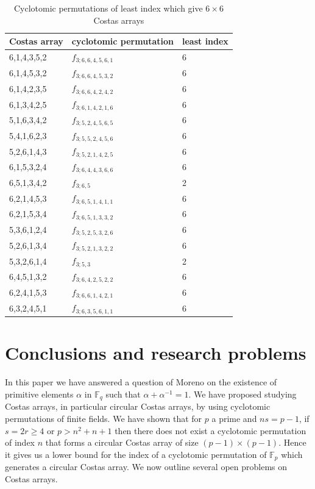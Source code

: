 \documentclass[10pt]{amsart}
\begin{document}
\begin{table}
\caption{Cyclotomic permutations of least index which give $6 \times 6$
Costas arrays}
\label{costas6}
\begin{tabular}{l|l|l}
Costas array&cyclotomic permutation&least index\\
\hline
6,1,4,3,5,2&$f_{3; 6, 6,4,5,6,1}$&6\\
6,1,4,5,3,2&$f_{3; 6, 6,4,5,3,2}$&6\\
6,1,4,2,3,5&$f_{3; 6, 6,4,2,4,2}$&6\\
6,1,3,4,2,5&$f_{3; 6, 1,4,2,1,6}$&6\\
5,1,6,3,4,2&$f_{3; 5, 2,4,5,6,5}$&6\\
5,4,1,6,2,3&$f_{3; 5, 5,2,4,5,6}$&6\\
5,2,6,1,4,3&$f_{3; 5, 2,1,4,2,5}$&6\\
6,1,5,3,2,4&$f_{3; 6, 4,4,3,6,6}$&6\\
6,5,1,3,4,2&$f_{3; 6,5}$&2\\
6,2,1,4,5,3&$f_{3; 6, 5,1,4,1,1}$&6\\
6,2,1,5,3,4&$f_{3; 6, 5,1,3,3,2}$&6\\
5,3,6,1,2,4&$f_{3; 5, 2,5,3,2,6}$&6\\
5,2,6,1,3,4&$f_{3; 5, 2,1,3,2,2}$&6\\
5,3,2,6,1,4&$f_{3; 5,3}$&2\\
6,4,5,1,3,2&$f_{3; 6, 4,2,5,2,2}$&6\\
6,2,4,1,5,3&$f_{3; 6, 6,1,4,2,1}$&6\\
6,3,2,4,5,1&$f_{3; 6, 3,5,6,1,1}$&6
\end{tabular}
\end{table}

\section{Conclusions and research problems}
In this paper we  have answered a question of Moreno on the
existence of primitive elements $\alpha$ in $\mathbb{F}_q$ such
that $\alpha+\alpha^{-1}=1$. We have  proposed studying Costas
arrays, in particular circular Costas arrays, by using cyclotomic
permutations of finite fields. We have shown that for $p$ a prime
and $ns=p-1$, if $s=2r \geq 4$ or $p>n^2+n+1$ then there does
not exist a cyclotomic permutation of index $n$ that forms a
circular Costas array of size $(p-1)\times (p-1)$.
Hence it gives us a lower bound for the index of a
cyclotomic permutation of $\mathbb{F}_p$ which generates a
circular Costas array. We now outline several open problems on
Costas arrays.
\end{document}
